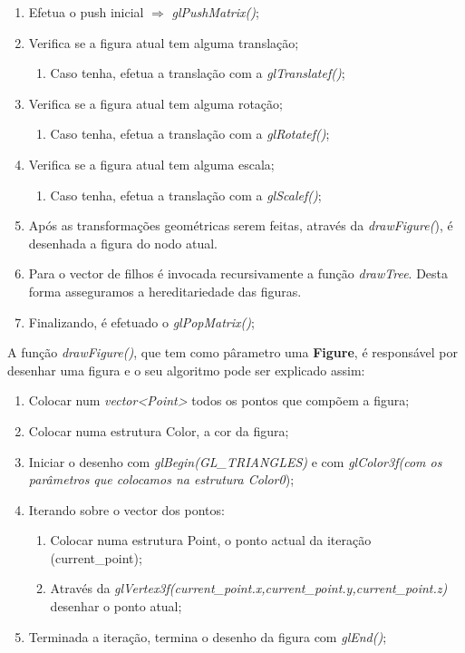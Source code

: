 \documentclass[a4paper]{article}
\begin{document}
\ttfamily
\begin{enumerate}
 \item Efetua o push inicial  $\Rightarrow$ \textit{glPushMatrix()};
 \item Verifica se a figura atual tem alguma translação;
    \begin{enumerate}
      \item Caso tenha, efetua a translação com a \textit{glTranslatef()};
    \end{enumerate}
  \item Verifica se a figura atual tem alguma rotação;
    \begin{enumerate}
      \item Caso tenha, efetua a translação com a \textit{glRotatef()};
    \end{enumerate}
 \item Verifica se a figura atual tem alguma escala;
    \begin{enumerate}
      \item Caso tenha, efetua a translação com a \textit{glScalef()};
    \end{enumerate}
 \item Após as transformações geométricas serem feitas, através da \textit{drawFigure(}), é desenhada a figura do nodo atual.
 \item Para o vector de filhos é invocada recursivamente a função \emph{drawTree}. Desta forma asseguramos a hereditariedade das figuras.
 \item Finalizando, é efetuado o \textit{glPopMatrix()};
\end{enumerate}

\rmfamily

  \vspace{0.3cm}

 A função \textit{drawFigure()}, que tem como pârametro uma \textbf{Figure}, é responsável por desenhar uma figura e o seu algoritmo pode ser explicado assim:

\ttfamily

  \vspace{0.3cm}

\begin{enumerate}
 \item Colocar num \textit{vector<Point>} todos os pontos que compõem a figura;
 \item Colocar numa estrutura Color, a cor da figura;
 \item Iniciar o desenho com \textit{glBegin(GL\_TRIANGLES)} e com \textit{glColor3f(com os parâmetros que colocamos na estrutura Color0});
 \item Iterando sobre o vector dos pontos:
	\begin{enumerate}
	\item Colocar numa estrutura Point, o ponto actual da iteração (current\_point);
	\item Através da \textit{glVertex3f(current\_point.x,current\_point.y,current\_point.z)} desenhar o ponto atual;
	\end{enumerate}
\item Terminada a iteração, termina o desenho da figura com \textit{glEnd()};
\end{enumerate}
\end{document}
